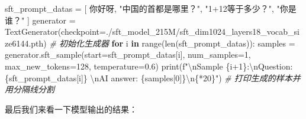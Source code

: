 \documentclass[
]{article}
\newenvironment{Shaded}{}{}
\newcommand{\BuiltInTok}[1]{\textcolor[rgb]{0.00,0.50,0.00}{#1}}
\newcommand{\CharTok}[1]{\textcolor[rgb]{0.25,0.44,0.63}{#1}}
\newcommand{\CommentTok}[1]{\textcolor[rgb]{0.38,0.63,0.69}{\textit{#1}}}
\newcommand{\ControlFlowTok}[1]{\textcolor[rgb]{0.00,0.44,0.13}{\textbf{#1}}}
\newcommand{\DecValTok}[1]{\textcolor[rgb]{0.25,0.63,0.44}{#1}}
\newcommand{\FloatTok}[1]{\textcolor[rgb]{0.25,0.63,0.44}{#1}}
\newcommand{\KeywordTok}[1]{\textcolor[rgb]{0.00,0.44,0.13}{\textbf{#1}}}
\newcommand{\NormalTok}[1]{#1}
\newcommand{\OperatorTok}[1]{\textcolor[rgb]{0.40,0.40,0.40}{#1}}
\newcommand{\SpecialCharTok}[1]{\textcolor[rgb]{0.25,0.44,0.63}{#1}}
\newcommand{\SpecialStringTok}[1]{\textcolor[rgb]{0.73,0.40,0.53}{#1}}
\newcommand{\StringTok}[1]{\textcolor[rgb]{0.25,0.44,0.63}{#1}}
\begin{document}
\begin{Shaded}
\begin{Highlighting}[]
\NormalTok{    sft\_prompt\_datas }\OperatorTok{=}\NormalTok{ [}
        \StringTok{\textquotesingle{}你好呀\textquotesingle{}}\NormalTok{,}
        \StringTok{"中国的首都是哪里？"}\NormalTok{,}
        \StringTok{"1+12等于多少？"}\NormalTok{,}
        \StringTok{"你是谁？"}
\NormalTok{    ]}
\NormalTok{    generator }\OperatorTok{=}\NormalTok{ TextGenerator(checkpoint}\OperatorTok{=}\StringTok{\textquotesingle{}./sft\_model\_215M/sft\_dim1024\_layers18\_vocab\_size6144.pth\textquotesingle{}}\NormalTok{)  }\CommentTok{\# 初始化生成器}
    \ControlFlowTok{for}\NormalTok{ i }\KeywordTok{in} \BuiltInTok{range}\NormalTok{(}\BuiltInTok{len}\NormalTok{(sft\_prompt\_datas)):}
\NormalTok{        samples }\OperatorTok{=}\NormalTok{ generator.sft\_sample(start}\OperatorTok{=}\NormalTok{sft\_prompt\_datas[i], num\_samples}\OperatorTok{=}\DecValTok{1}\NormalTok{, max\_new\_tokens}\OperatorTok{=}\DecValTok{128}\NormalTok{, temperature}\OperatorTok{=}\FloatTok{0.6}\NormalTok{)}
        \BuiltInTok{print}\NormalTok{(}\SpecialStringTok{f"}\CharTok{\textbackslash{}n}\SpecialStringTok{Sample }\SpecialCharTok{\{}\NormalTok{i}\OperatorTok{+}\DecValTok{1}\SpecialCharTok{\}}\SpecialStringTok{:}\CharTok{\textbackslash{}n}\SpecialStringTok{Question: }\SpecialCharTok{\{}\NormalTok{sft\_prompt\_datas[i]}\SpecialCharTok{\}}\SpecialStringTok{ }\CharTok{\textbackslash{}n}\SpecialStringTok{AI answer: }\SpecialCharTok{\{}\NormalTok{samples[}\DecValTok{0}\NormalTok{]}\SpecialCharTok{\}}\CharTok{\textbackslash{}n}\SpecialCharTok{\{}\StringTok{\textquotesingle{}{-}\textquotesingle{}}\OperatorTok{*}\DecValTok{20}\SpecialCharTok{\}}\SpecialStringTok{"}\NormalTok{)  }\CommentTok{\# 打印生成的样本并用分隔线分割}
\end{Highlighting}
\end{Shaded}

最后我们来看一下模型输出的结果：
\end{document}
